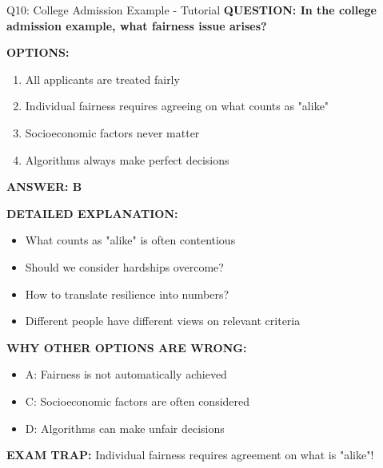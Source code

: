 \documentclass[8pt]{beamer}
\begin{document}
	\begin{frame}{Q10: College Admission Example - Tutorial}
		\fontsize{6.5}{7.5}\selectfont
		\textbf{QUESTION: In the college admission example, what fairness issue arises?}
		
		\vspace{0.1cm}
		\textbf{OPTIONS:}
		\begin{enumerate}
			\item All applicants are treated fairly
			\item Individual fairness requires agreeing on what counts as "alike"
			\item Socioeconomic factors never matter
			\item Algorithms always make perfect decisions
		\end{enumerate}
		
		\vspace{0.1cm}
		\textcolor{myblue}{\textbf{ANSWER: B}}
		
		\vspace{0.1cm}
		\textbf{DETAILED EXPLANATION:}
		\begin{itemize}
			\item What counts as "alike" is often contentious
			\item Should we consider hardships overcome?
			\item How to translate resilience into numbers?
			\item Different people have different views on relevant criteria
		\end{itemize}
		
		\vspace{0.1cm}
		\textcolor{myred}{\textbf{WHY OTHER OPTIONS ARE WRONG:}}
		\begin{itemize}
			\item \textcolor{myred}{A:} Fairness is not automatically achieved
			\item \textcolor{myred}{C:} Socioeconomic factors are often considered
			\item \textcolor{myred}{D:} Algorithms can make unfair decisions
		\end{itemize}
		
		\textcolor{myred}{\textbf{EXAM TRAP:}} Individual fairness requires \textcolor{myblue}{agreement on what is "alike"}!
	\end{frame}
	
\end{document}

